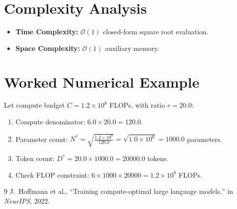 \documentclass[11pt,a4paper]{article}
\theoremstyle{definition}
\begin{document}
\section{Complexity Analysis}
\begin{itemize}
    \item \textbf{Time Complexity:} $\mathcal{O}(1)$ closed-form square root evaluation.
    \item \textbf{Space Complexity:} $\mathcal{O}(1)$ auxiliary memory.
\end{itemize}

\section{Worked Numerical Example}
Let compute budget $C = 1.2 \times 10^8$ FLOPs, with ratio $r = 20.0$:
\begin{enumerate}
    \item Compute denominator: $6.0 \times 20.0 = 120.0$.
    \item Parameter count:
    $N^* = \sqrt{\frac{1.2 \times 10^8}{120.0}} = \sqrt{1.0 \times 10^6} = 1000.0$ parameters.
    \item Token count:
    $D^* = 20.0 \times 1000.0 = 20000.0$ tokens.
    \item Check FLOP constraint: $6 \times 1000 \times 20000 = 1.2 \times 10^8$ FLOPs.
\end{enumerate}

\begin{thebibliography}{9}
 J.~Hoffmann et al., ``Training compute-optimal large language models,'' in \emph{NeurIPS}, 2022.
\end{thebibliography}
\end{document}
